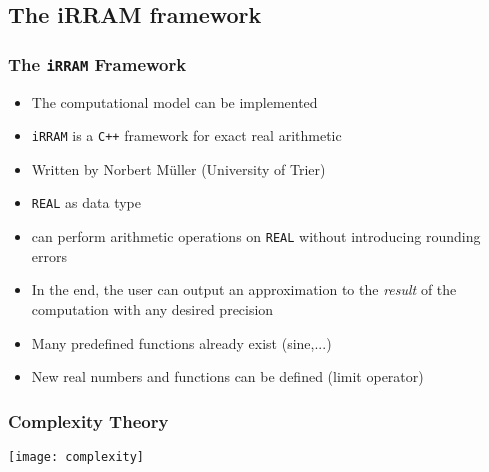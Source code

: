 \documentclass[handout,xcolor=pdftex,dvipsnames,table]{beamer}
\newcommand{\cc}{\texttt{C++}\xspace}
\newcommand{\irram}{\texttt{iRRAM}\xspace}
\newcommand{\code}[1]{\texttt{#1}}
\newcommand{\real}{\code{REAL}\xspace}
\begin{document}
\subsection{The iRRAM framework}
\begin{frame}
  \frametitle{The \irram Framework}
  \begin{itemize}[<+->]
  \item The computational model can be implemented
  \item \irram is a \cc framework for exact real arithmetic
  \item Written by Norbert M\"{u}ller (University of Trier)
  \item \real as data type
  \item can perform arithmetic operations on \real without introducing rounding errors
  \item In the end, the user can output an approximation to the \emph{result} of the computation with any desired precision
  \item Many predefined functions already exist (sine,...)
  \item New real numbers and functions can be defined (limit operator)
  \end{itemize}
\end{frame}

\begin{frame}
  \frametitle{Complexity Theory}
  \centering
  \texttt{[image: complexity]}
  \end{frame}
\end{document}

